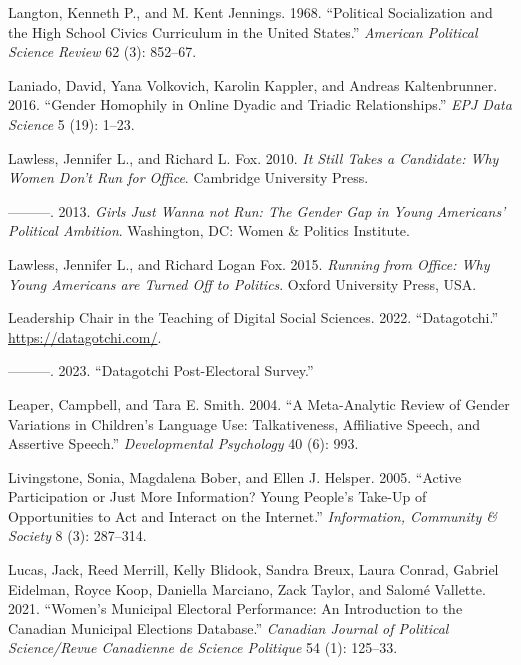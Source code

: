 \documentclass[
  letterpaper,
  DIV=11,
  numbers=noendperiod]{scrreprt}
\newlength{\cslhangindent}
\newlength{\cslentryspacingunit} %
\newenvironment{CSLReferences}[2] %
 {%
  \setlength{\parindent}{0pt}
  \ifodd #1
  \let\oldpar\par
  \def\par{\hangindent=\cslhangindent\oldpar}
  \fi
  \setlength{\parskip}{#2\cslentryspacingunit}
 }%
 {}
\begin{document}
\begin{CSLReferences}{1}{0}
\leavevmode{}%
Langton, Kenneth P., and M. Kent Jennings. 1968. {``{Political
Socialization and the High School Civics Curriculum in the United
States}.''} \emph{American Political Science Review} 62 (3): 852--67.

\leavevmode{}%
Laniado, David, Yana Volkovich, Karolin Kappler, and Andreas
Kaltenbrunner. 2016. {``{Gender Homophily in Online Dyadic and Triadic
Relationships}.''} \emph{EPJ Data Science} 5 (19): 1--23.

\leavevmode{}%
Lawless, Jennifer L., and Richard L. Fox. 2010. \emph{{It Still Takes a
Candidate: Why Women Don't Run for Office}}. Cambridge University Press.

\leavevmode{}%
---------. 2013. \emph{{Girls Just Wanna not Run: The Gender Gap in
Young Americans' Political Ambition}}. Washington, DC: Women \& Politics
Institute.

\leavevmode{}%
Lawless, Jennifer L., and Richard Logan Fox. 2015. \emph{{Running from
Office: Why Young Americans are Turned Off to Politics}}. Oxford
University Press, USA.

\leavevmode{}%
Leadership Chair in the Teaching of Digital Social Sciences. 2022.
{``{Datagotchi}.''} \url{https://datagotchi.com/}.

\leavevmode{}%
---------. 2023. {``{Datagotchi Post-Electoral Survey}.''}

\leavevmode{}%
Leaper, Campbell, and Tara E. Smith. 2004. {``{A Meta-Analytic Review of
Gender Variations in Children's Language Use: Talkativeness, Affiliative
Speech, and Assertive Speech}.''} \emph{Developmental Psychology} 40
(6): 993.

\leavevmode{}%
Livingstone, Sonia, Magdalena Bober, and Ellen J. Helsper. 2005.
{``{Active Participation or Just More Information? Young People's
Take-Up of Opportunities to Act and Interact on the Internet}.''}
\emph{Information, Community \& Society} 8 (3): 287--314.

\leavevmode{}%
Lucas, Jack, Reed Merrill, Kelly Blidook, Sandra Breux, Laura Conrad,
Gabriel Eidelman, Royce Koop, Daniella Marciano, Zack Taylor, and Salomé
Vallette. 2021. {``{Women's Municipal Electoral Performance: An
Introduction to the Canadian Municipal Elections Database}.''}
\emph{Canadian Journal of Political Science/Revue Canadienne de Science
Politique} 54 (1): 125--33.


\end{CSLReferences}
\end{document}

